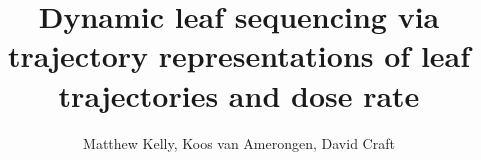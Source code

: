 

\title{Dynamic leaf sequencing via trajectory representations of leaf trajectories and dose rate}

\author{Matthew Kelly, Koos van Amerongen, David Craft}



\maketitle
\thispagestyle{empty}















